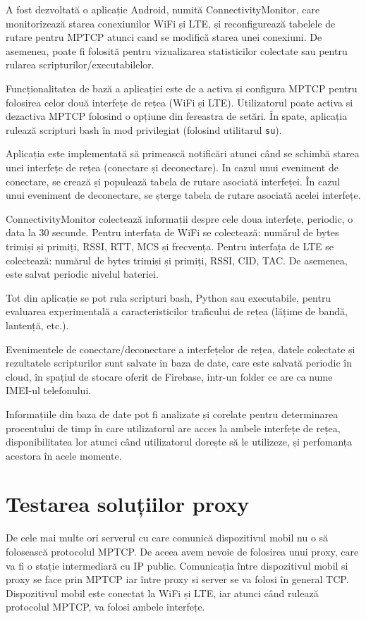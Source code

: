 A fost dezvoltată o aplicație Android, numită ConnectivityMonitor,  care monitorizează starea conexiunilor WiFi și LTE, și reconfigurează tabelele de rutare pentru MPTCP atunci cand se modifică starea unei conexiuni. De asemenea, poate fi folosită pentru vizualizarea statisticilor colectate sau pentru rularea scripturilor/executabilelor. 

Funcționalitatea de bază a aplicației este de a activa și configura MPTCP pentru folosirea celor două interfețe de rețea (WiFi și LTE). Utilizatorul poate activa si dezactiva MPTCP folosind o opțiune din fereastra de setări. În spate, aplicația rulează scripturi bash în mod privilegiat (folosind utilitarul \texttt{su}).

Aplicația este implementată să primească notificări atunci când se schimbă starea unei interfețe de rețea (conectare și deconectare). In cazul unui eveniment de conectare, se crează și populează tabela de rutare asociată interfeței. În cazul unui eveniment de deconectare, se șterge tabela de rutare asociată acelei interfețe.

ConnectivityMonitor colectează informații despre cele doua interfețe, periodic, o data la 30 secunde. Pentru interfața de WiFi se colectează: numărul de bytes trimiși și primiți, RSSI, RTT, MCS și frecvența. Pentru interfața de LTE se colectează: numărul de bytes trimiși și primiți, RSSI, CID, TAC. De asemenea, este salvat periodic nivelul bateriei. 

Tot din aplicație se pot rula scripturi bash, Python sau executabile, pentru evaluarea experimentală a caracteristicilor traficului de rețea (lățime de bandă, lantență, etc.).

Evenimentele de conectare/deconectare a interfețelor de rețea, datele colectate și rezultatele scripturilor sunt salvate in baza de date, care este salvată periodic în cloud, în spațiul de stocare oferit de Firebase, intr-un folder ce are ca nume IMEI-ul telefonului.

Informațiile din baza de date pot fi analizate și corelate pentru determinarea procentului de timp în care utilizatorul are acces la ambele interfețe de rețea, disponibilitatea lor atunci când utilizatorul dorește să le utilizeze, și perfomanța acestora în  acele momente.

\section{Testarea soluțiilor proxy}

De cele mai multe ori serverul cu care comunică dispozitivul mobil nu o să folosească protocolul MPTCP. De aceea avem nevoie de folosirea unui proxy, care va fi o stație intermediară cu IP public. Comunicația între dispozitivul mobil si proxy se face prin MPTCP iar între proxy si server se va folosi în general TCP. Dispozitivul mobil este conectat la WiFi și LTE, iar atunci când rulează protocolul MPTCP, va folosi ambele interfețe.

